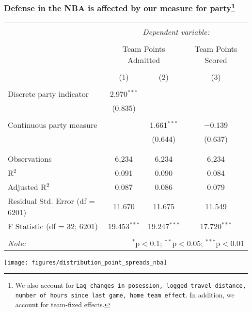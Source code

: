 \documentclass{beamer}
\begin{document}
\begin{frame}   \frametitle{Defense in the NBA is affected by our measure for party\footnote{\tiny{We also account for \texttt{Lag changes in posession, logged travel distance, number of hours since last game, home team effect}. In addition, we account for team-fixed effects.}}}
\scriptsize{
\begin{tabular}{@{\extracolsep{5pt}}lccc}  \\[-1.8ex]\hline  \hline \\[-1.8ex]   & \multicolumn{3}{c}{\textit{Dependent variable:}} \\  \cline{2-4}  \\[-1.8ex] & \multicolumn{2}{c}{Team Points Admitted} & Team Points Scored \\  \\[-1.8ex] & (1) & (2) & (3)\\  \hline \\[-1.8ex]   Discrete party indicator & 2.970$^{***}$ &  &  \\    & (0.835) &  &  \\    & & & \\   Continuous party measure &  & 1.661$^{***}$ & $-$0.139 \\    &  & (0.644) & (0.637) \\    & & & \\  \hline \\[-1.8ex]  Observations & 6,234 & 6,234 & 6,234 \\  R$^{2}$ & 0.091 & 0.090 & 0.084 \\  Adjusted R$^{2}$ & 0.087 & 0.086 & 0.079 \\  Residual Std. Error (df = 6201) & 11.670 & 11.675 & 11.549 \\  F Statistic (df = 32; 6201) & 19.453$^{***}$ & 19.247$^{***}$ & 17.720$^{***}$ \\  \hline  \hline \\[-1.8ex]  \textit{Note:}  & \multicolumn{3}{r}{$^{*}$p$<$0.1; $^{**}$p$<$0.05; $^{***}$p$<$0.01} \\  \end{tabular} 
} \end{frame}


\begin{frame}
  \centering
  \texttt{[image: figures/distribution\_point\_spreads\_nba]}
\end{frame}
\end{document}
